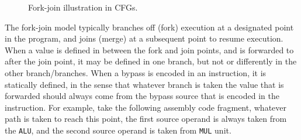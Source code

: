 \begin{figure}[t!]
\centering
{}
\hfil
{}
\caption{Fork-join illustration in CFGs.}
\label{fig:fork_join_ill}
\end{figure}

The fork-join model typically branches off (fork) execution at a designated point in the program, and joins (merge) at a subsequent point to resume execution. %
When a value is defined in between the fork and join points, and is forwarded to after the join point, it may be defined in one branch, but not or differently in the other branch/branches. When a bypass is encoded in an instruction, it is statically defined, in the sense that whatever branch is taken the value that is forwarded should always come from the bypass source that is encoded in the instruction. For example, take the following assembly code fragment, whatever path is taken to reach this point, the first source operand is always taken from the \texttt{ALU}, and the second source operand is taken from \texttt{MUL} unit.

